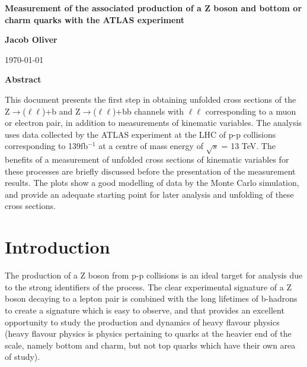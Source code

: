 \documentclass[12pt,a4paper,epsf,portrait,times,epsfig]{report}
\begin{document}
	\begin{center}
		{\Large \bf Measurement of the associated production of a Z boson and bottom or charm quarks with the ATLAS experiment}
	\end{center}
		
		\vspace{3.0cm}
		
	\begin{center}
		{\Large \bf Jacob Oliver}
	\end{center}

		\vspace{1.5cm}
		
	\begin{center}
		\today
	\end{center}
		
		\vspace{3.0cm}
		
		
	\begin{center}
		{\large \bf Abstract}
	\end{center}
	This document presents the first step in obtaining unfolded cross sections of the Z$\rightarrow$($\ell\ell$)+b and Z$\rightarrow$($\ell\ell$)+bb channels with $\ell\ell$ corresponding to a muon or electron pair, in addition to measurements of kinematic variables. The analysis uses data collected by the ATLAS experiment at the LHC of p-p collisions corresponding to 139fb$^{-1}$ at a centre of mass energy of $\sqrt{s}$ = 13 TeV. The benefits of a measurement of unfolded cross sections of kinematic variables for these processes are briefly discussed before the presentation of the measurement results. The plots show a good modelling of data by the Monte Carlo simulation, and provide an adequate starting point for later analysis and unfolding of these cross sections.   
	
	\newpage
	\tableofcontents
	\newpage
	
	\chapter{Introduction}
	
	The production of a Z boson from p-p collisions is an ideal target for analysis due to the strong identifiers of the process. The clear experimental signature of a Z boson decaying to a lepton pair is combined with the long lifetimes of b-hadrons to create a signature which is easy to observe, and that provides an excellent opportunity to study the production and dynamics of heavy flavour physics (heavy flavour physics is physics pertaining to quarks at the heavier end of the scale, namely bottom and charm, but not top quarks which have their own area of study). \par
	
\end{document}

